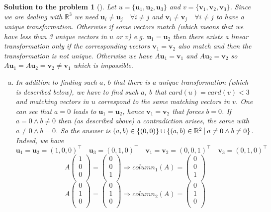 \documentclass[12pt,a4]{article}
\newtheorem{solution}{Solution to the problem}
\newcommand{\bu}{{\mathbf u}}
\newcommand{\bv}{{\mathbf v}}
\begin{document}
\begin{solution}[]\rm Let $u = \{\bu_1, \bu_2, \bu_3\}$ and $v = \{\bv_1, \bv_2, \bv_3\}$. Since we are dealing with $\mathbb{R}^3$ we need $\bu_i \neq \bu_j \quad \forall i\neq j$ and $ \bv_i \neq \bv_j \quad \forall i\neq j $ to have a unique transformation. Otherwise if some vectors match (which means that we have less than 3 unique vectors in $u$ or $v$) e.g. $\bu_1 = \bu_2$ then there exists a linear transformation only if the corresponding vectors $\bv_1 = \bv_2$ also match and then the transformation is not unique. Otherwise we have $A\bu_1 = \bv_1$ and $A\bu_2 = \bv_2$ so $A\bu_1 = A\bu_2 = \bv_2 \neq \bv_1$ which is impossible.\\
\begin{enumerate}[(a)]
\item In addition to finding such $a$, $b$ that there is a unique transformation (which is described below), we have to find such $a$, $b$ that $card(u) = card(v) < 3$ and matching vectors in $u$ correspond to the same matching vectors in $v$. One can see that $a = 0$ leads to $\bu_1 = \bu_2$, hence $\bv_1 = \bv_2$ that forces $b=0$. If $a = 0 \wedge b \neq 0$ then (as described above) a contradiction arises, the same with $a \neq 0 \wedge b = 0$. So the answer is $(a,b) \in \{(0,0)\} \cup \{(a,b) \in \mathbb{R}^2~\vline~a \neq 0 \wedge b \neq 0\} $.
Indeed, we have
\[
\bu_1 = \bu_2 = (1,0,0)^\top \quad
\bu_3 = (0,1,0)^\top \quad
\bv_1 = \bv_2 = (0,0,1)^\top \quad
\bv_3 = (0,1,0)^\top
\]
\[
A\begin{pmatrix}1\\0\\0\\\end{pmatrix} = \begin{pmatrix}0\\0\\1\\\end{pmatrix} \Rightarrow column_1(A) = \begin{pmatrix}0\\0\\1\\\end{pmatrix}
\]
\[
A\begin{pmatrix}0\\1\\0\\\end{pmatrix} = \begin{pmatrix}0\\1\\0\\\end{pmatrix} \Rightarrow column_2(A) = \begin{pmatrix}0\\1\\0\\\end{pmatrix}
\]
\end{enumerate}
\end{solution}
\end{document}
